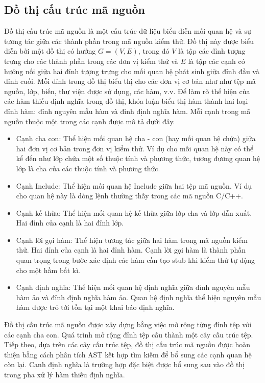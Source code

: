 \subsection*{Đồ thị cấu trúc mã nguồn}
Đồ thị cấu trúc mã nguồn là một cấu trúc dữ liệu biểu diễn mối quan hệ và sự tương tác giữa các thành phần trong mã nguồn kiểm thử. Đồ thị này được biểu diễn bởi một đồ thị có hướng $G = (V, E)$, trong đó $V$ là tập các đỉnh tượng trưng cho các thành phần trong các đơn vị kiểm thử và $E$ là tập các cạnh có hướng nối giữa hai đỉnh tượng trưng cho mối quan hệ phát sinh giữa đỉnh đầu và đỉnh cuối. Mỗi đỉnh trong đồ thị biểu thị cho các đơn vị cơ bản như như tệp mã nguồn, lớp, biến, thư viện được sử dụng, các hàm, v.v. Để làm rõ thể hiện của các hàm thiếu định nghĩa trong đồ thị, khóa luận biểu thị hàm thành hai loại đỉnh hàm: đỉnh nguyên mẫu hàm và đỉnh định nghĩa hàm. Mỗi cạnh trong mã nguồn thuộc một trong các cạnh được mô tả dưới đây.
\begin{itemize}
    \item Cạnh cha con: Thể hiện mối quan hệ cha - con (hay mối quan hệ chứa) giữa hai đơn vị cơ bản trong đơn vị kiểm thử. Ví dụ cho mối quan hệ này có thể kể đến như lớp chứa một số thuộc tính và phương thức, tương đương quan hệ lớp là cha của các thuộc tính và phương thức.
    \item Cạnh Include: Thể hiện mối quan hệ Include giữa hai tệp mã nguồn. Ví dụ cho quan hệ này là dòng lệnh  thường thấy trong các mã nguồn C/C++.
    \item Cạnh kế thừa: Thể hiện mối quan hệ kế thừa giữa lớp cha và lớp dẫn xuất. Hai đỉnh của cạnh là hai đỉnh lớp.
    \item Cạnh lời gọi hàm: Thể hiện tương tác giữa hai hàm trong mã nguồn kiểm thử. Hai đỉnh của cạnh là hai đỉnh hàm. Cạnh lời gọi hàm là thành phần quan trọng trong bước xác định các hàm cần tạo stub khi kiểm thử tự động cho một hầm bất kì.
    \item Cạnh định nghĩa: Thể hiện mối quan hệ định nghĩa giữa đỉnh nguyên mẫu hàm ảo và đỉnh định nghĩa hàm ảo. Quan hệ định nghĩa thể hiện nguyên mẫu hàm được trỏ tới tồn tại một khai báo định nghĩa.
\end{itemize}

Đồ thị cấu trúc mã nguồn được xây dựng bằng việc mở rộng từng đỉnh tệp với các cạnh cha con. Quá trình mở rộng đỉnh tệp cấu thành một cây cấu trúc tệp. Tiếp theo, dựa trên các cây cấu trúc tệp, đồ thị cấu trúc mã nguồn được hoàn thiện bằng cách phân tích AST kết hợp tìm kiếm để bổ sung các cạnh quan hệ còn lại. Cạnh định nghĩa là trường hợp đặc biệt được bổ sung sau vào đồ thị trong pha xử lý hàm thiếu định nghĩa.

